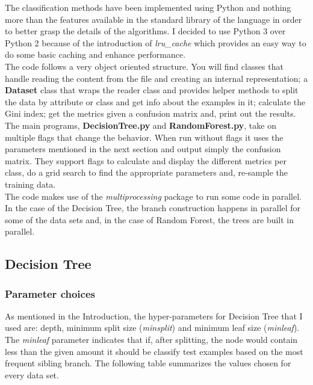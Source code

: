 \documentclass[11pt]{article}
\begin{document}
The classification methods have been implemented using Python and nothing more than the features available in the standard library of the language in order to better grasp the details of the algorithms. I decided to use Python 3 over Python 2 because of the introduction of \textit{lru\_cache} which provides an easy way to do some basic caching and enhance performance.\\

The code follows a very object oriented structure. You will find classes that handle reading the content from the file and creating an internal representation; a \textbf{Dataset} class that wraps the reader class and provides helper methods to split the data by attribute or class and get info about the examples in it; calculate the Gini index; get the metrics given a confusion matrix and, print out the results.\\

The main programs, \textbf{DecisionTree.py} and \textbf{RandomForest.py}, take on multiple flags that change the behavior. When run without flags it uses the parameters mentioned in the next section and output simply the confusion matrix. They support flags to calculate and display the different metrics per class, do a grid search to find the appropriate parameters and, re-sample the training data.\\

The code makes use of the \textit{multiprocessing} package to run some code in parallel. In the case of the Decision Tree, the branch construction happens in parallel for some of the data sets and, in the case of Random Forest, the trees are built in parallel.

\subsection*{Decision Tree}

\subsubsection*{Parameter choices}

As mentioned in the Introduction, the hyper-parameters for Decision Tree that I used are: depth, minimum split size (\textit{minsplit}) and minimum leaf size (\textit{minleaf}). The \textit{minleaf} parameter indicates that if, after splitting, the node would contain less than the given amount it should be classify test examples based on the most frequent sibling branch. The following table summarizes the values chosen for every data set.
\end{document}
